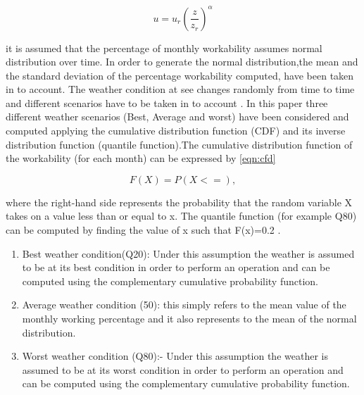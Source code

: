 \begin{equation}
\label{eqn:windprofile}
u = u_{r} \left( \frac{z}{z_r} \right)^{\alpha}
\end{equation}

it is assumed that the percentage of monthly workability assumes normal distribution over time. In order to  generate the normal distribution,the mean and the standard deviation of the percentage workability computed, have been taken in to account. The weather condition at see changes randomly from time to time and different scenarios have to be taken in to account . In this paper three different weather scenarios (Best, Average and worst) have been considered and computed applying the cumulative distribution function (CDF) and its inverse distribution function (quantile function).The cumulative distribution function of the workability (for each month) can be expressed by \ref{eqn:cfd}

\begin{equation}
\label{eqn:cfd}
F\left( X \right) =P\left(X<=\right),

\end{equation}


 where the right-hand side represents the probability that the random variable X takes on a value less than or equal to x. The quantile function (for example Q80) can be computed by finding the value of x such that F(x)=0.2 .  

\begin{enumerate}[label=\roman*]
\item
Best weather condition(Q20): Under this assumption the weather is assumed to be at its best condition in order to perform an operation and can be computed using the complementary cumulative probability function. 
\item
Average weather condition (50): this simply refers to the mean value of the monthly working percentage and it also represents to the mean of the normal distribution.
\item Worst weather condition (Q80):- Under this assumption the weather is assumed to be at its worst condition in order to perform an operation and can be computed using the complementary cumulative probability function. 
\end{enumerate}

